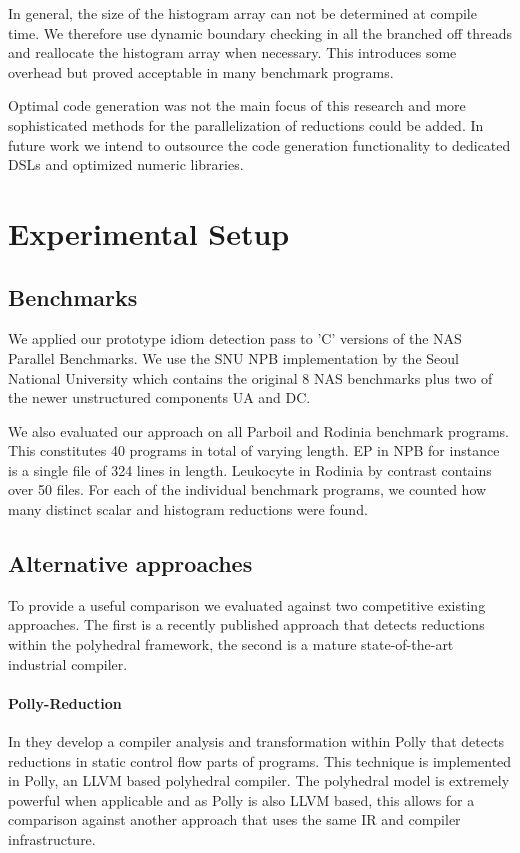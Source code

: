 In general, the size of the histogram array can not be determined at
compile time.  We therefore use dynamic boundary checking in all the
branched off threads and reallocate the histogram array when
necessary.  This introduces some overhead but proved acceptable in
many benchmark programs.

Optimal code generation was not the main focus of this research and more sophisticated methods for the parallelization of reductions could be added.
In future work we intend to outsource the code generation functionality to dedicated DSLs and optimized numeric libraries.


\section{Experimental Setup}

\subsection{Benchmarks}
We applied our prototype idiom detection pass to 'C' versions of the NAS Parallel Benchmarks.
We use the SNU NPB implementation by the Seoul National University which contains
the original 8 NAS benchmarks plus two of the newer unstructured components UA and DC. %

We also evaluated our approach on all Parboil and Rodinia
benchmark programs.  This constitutes 40 programs in total of varying
length.  EP in NPB for instance is a single file of 324 lines in
length. Leukocyte in Rodinia by contrast contains over 50 files.
For each of the individual benchmark programs, we counted how many distinct scalar and histogram reductions were found.

\subsection{Alternative approaches}
To provide a useful comparison we evaluated against two competitive
existing approaches. The first is a  recently published approach that detects 
reductions within the polyhedral framework, the second is a mature state-of-the-art industrial  compiler.

\paragraph{Polly-Reduction}
In \cite{Doerfert2015Polly} they develop a compiler analysis and transformation within Polly
that detects reductions in static control flow parts of programs.
This technique is implemented in Polly, an LLVM based polyhedral compiler.
The polyhedral model is extremely powerful when applicable and as Polly is also LLVM based, this allows for a comparison against another approach that uses the same IR and compiler infrastructure.

